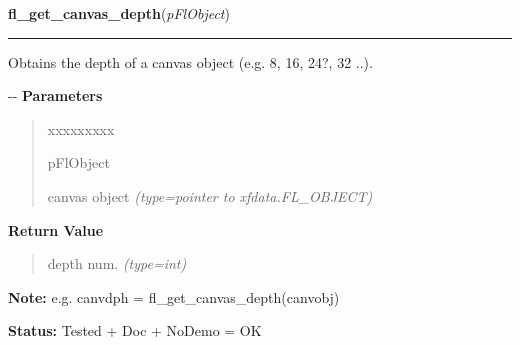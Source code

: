 \hspace{.8\funcindent}\begin{boxedminipage}{\funcwidth}

    \raggedright \textbf{fl\_get\_canvas\_depth}(\textit{pFlObject})

    \vspace{-1.5ex}

    \rule{\textwidth}{0.5\fboxrule}
\setlength{\parskip}{2ex}

Obtains the depth of a canvas object (e.g. 8, 16, 24?, 32 ..).

-{}-
\setlength{\parskip}{1ex}
      \textbf{Parameters}
      \vspace{-1ex}

      \begin{quote}
        \begin{Ventry}{xxxxxxxxx}

          \item[pFlObject]


canvas object
            {\it (type=pointer to xfdata.FL\_OBJECT)}

        \end{Ventry}

      \end{quote}

      \textbf{Return Value}
    \vspace{-1ex}

      \begin{quote}

depth num.
      {\it (type=int)}

      \end{quote}

\textbf{Note:} 
e.g. canvdph = fl\_get\_canvas\_depth(canvobj)


\textbf{Status:} 
Tested + Doc + NoDemo = OK


    \end{boxedminipage}

    \label{xformslib:flcanvas:fl_remove_canvas_handler}

    \vspace{0.5ex}

